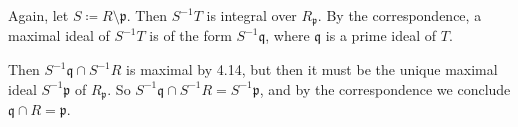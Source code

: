 Again, let $S\coloneqq R\setminus \mathfrak{p}$. Then $S^{-1}T$ is integral over
$R_{\mathfrak{p}}$. By the correspondence, a maximal ideal of $S^{-1}T$ is of
the form $S^{-1}\mathfrak{q}$, where $\mathfrak{q}$ is a prime ideal of $T$.

Then $S^{-1}\mathfrak{q}\cap S^{-1}R$ is maximal by 4.14, but then it must be the
unique maximal ideal $S^{-1}\mathfrak{p}$ of $R_{\mathfrak{p}}$. So
$S^{-1}\mathfrak{q} \cap S^{-1}R = S^{-1}\mathfrak{p}$, and by the correspondence
we conclude $\mathfrak{q}\cap R = \mathfrak{p}$.
